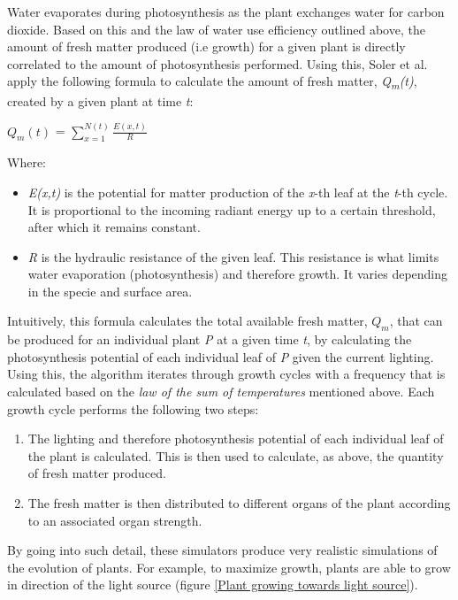 Water evaporates during photosynthesis as the plant exchanges water for carbon dioxide. Based on this and the law of water use efficiency outlined above, the amount of fresh matter produced (i.e growth) for a given plant is directly correlated to the amount of photosynthesis performed. Using this, Soler et al. ~\cite{Soler2001} apply the following formula to calculate the amount of fresh matter, \textit{Q\textsubscript{m}(t)}, created by a given plant at time \textit{t}:\\

\begin{center}	
\textit{$Q_{m}(t)$} = $\sum_{x=1}^{N(t)} \frac{E(x,t)}{R} $
\end{center}
Where:
\begin{itemize}
\item \textit{E(x,t)} is the potential for matter production of the \textit{x}-th leaf at the \textit{t}-th cycle. It is proportional to the incoming radiant energy up to a certain threshold, after which it remains constant. 
\item \textit{R} is the hydraulic resistance of the given leaf. This resistance is what limits water evaporation (photosynthesis) and therefore growth. It varies depending in the specie and surface area.
\end{itemize} 
Intuitively, this formula calculates the total available fresh matter, \textit{$Q_{m}$}, that can be produced for an individual plant \textit{P} at a given time \textit{t}, by calculating the photosynthesis potential of each individual leaf of \textit{P} given the current lighting.\\

Using this, the algorithm iterates through growth cycles with a frequency that is calculated based on the \textit{law of the sum of temperatures} mentioned above. Each growth cycle performs the following two steps:
\begin{enumerate}
\item The lighting and therefore photosynthesis potential of each individual leaf of the plant is calculated. This is then used to calculate, as above, the quantity of fresh matter produced.
\item The fresh matter is then distributed to different organs of the plant according to an associated organ strength.
\end{enumerate}

By going into such detail, these simulators produce very realistic simulations of the evolution of plants. For example, to maximize growth, plants are able to grow in direction of the light source (figure \ref{Plant growing towards light source}).\\

